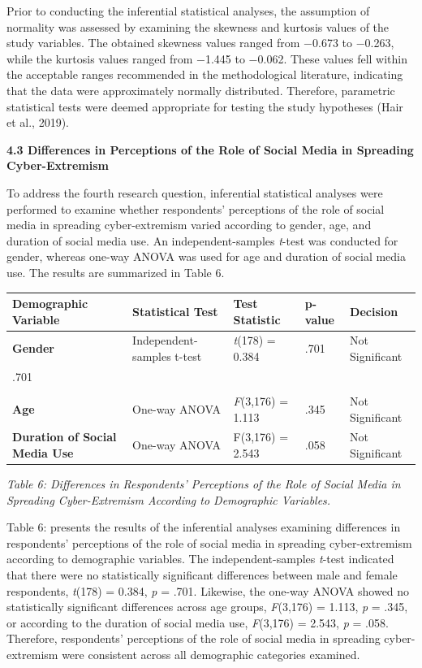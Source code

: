 \documentclass[11pt,a4paper]{article}
\begin{document}
	Prior to conducting the inferential statistical analyses, the assumption of normality was assessed by examining the skewness and kurtosis values of the study variables. The obtained skewness values ranged from −0.673 to −0.263, while the kurtosis values ranged from −1.445 to −0.062. These values fell within the acceptable ranges recommended in the methodological literature, indicating that the data were approximately normally distributed. Therefore, parametric statistical tests were deemed appropriate for testing the study hypotheses (Hair et al., 2019).
	
	\textbf{4.3 Differences in Perceptions of the Role of Social Media in Spreading Cyber-Extremism}
	
	To address the fourth research question, inferential statistical analyses were performed to examine whether respondents' perceptions of the role of social media in spreading cyber-extremism varied according to gender, age, and duration of social media use. An independent-samples \textit{t}-test was conducted for gender, whereas one-way ANOVA was used for age and duration of social media use. The results are summarized in Table 6.
	
	\begin{table}[h]
		\centering
		\begin{tabular}{|l|l|l|l|l|}
			\hline
			\textbf{Demographic Variable} & \textbf{Statistical Test} & \textbf{Test Statistic} & \textbf{p-value} & \textbf{Decision} \\ \hline
			\textbf{Gender} & Independent-samples t-test & \textit{t}(178) = 0.384 & .701 & Not Significant \\ \hline
			.701 &  &  &  &  \\ \hline
			&  &  &  &  \\ \hline
			\textbf{Age} & One-way ANOVA & \textit{F}(3,176) = 1.113 & .345 & Not Significant \\ \hline
			\textbf{Duration of Social Media Use} & One-way ANOVA & F(3,176) = 2.543 & .058 & Not Significant \\ \hline
		\end{tabular}
	\end{table}
	
	\textit{Table 6: Differences in Respondents' Perceptions of the Role of Social Media in Spreading Cyber-Extremism According to Demographic Variables.}
	
	Table 6: presents the results of the inferential analyses examining differences in respondents' perceptions of the role of social media in spreading cyber-extremism according to demographic variables. The independent-samples \textit{t}-test indicated that there were no statistically significant differences between male and female respondents, \textit{t}(178) = 0.384, \textit{p} = .701. Likewise, the one-way ANOVA showed no statistically significant differences across age groups, \textit{F}(3,176) = 1.113, \textit{p} = .345, or according to the duration of social media use, \textit{F}(3,176) = 2.543, \textit{p} = .058. Therefore, respondents' perceptions of the role of social media in spreading cyber-extremism were consistent across all demographic categories examined.
	
\end{document}
